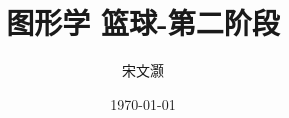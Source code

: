 \documentclass[10pt,a4paper]{article}
\begin{document}
\title{图形学 篮球-第二阶段}
\author{宋文灏}
\date{\today}
\maketitle
\end{document}
